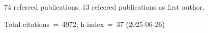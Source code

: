 74 refereed publications. 13 refeered publications as first author.

Total citations~=~4972; h-index~=~37 (2025-06-26)